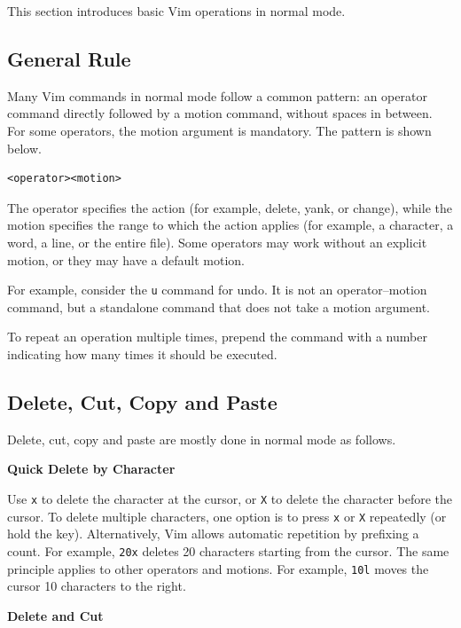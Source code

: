 This section introduces basic Vim operations in normal mode.

\subsection{General Rule}

Many Vim commands in normal mode follow a common pattern: an operator command directly followed by a motion command, without spaces in between. For some operators, the motion argument is mandatory. The pattern is shown below.
\begin{lstlisting}
<operator><motion>
\end{lstlisting}

The operator specifies the action (for example, delete, yank, or change), while the motion specifies the range to which the action applies (for example, a character, a word, a line, or the entire file). Some operators may work without an explicit motion, or they may have a default motion. 

For example, consider the \verb|u| command for undo. It is not an operator–motion command, but a standalone command that does not take a motion argument.

To repeat an operation multiple times, prepend the command with a number indicating how many times it should be executed.

\subsection{Delete, Cut, Copy and Paste}

Delete, cut, copy and paste are mostly done in normal mode as follows.

\vspace{0.1in}
\noindent \textbf{Quick Delete by Character}
\vspace{0.1in}

Use \verb|x| to delete the character at the cursor, or \verb|X| to delete the character before the cursor. To delete multiple characters, one option is to press \verb|x| or \verb|X| repeatedly (or hold the key). Alternatively, Vim allows automatic repetition by prefixing a count. For example, \verb|20x| deletes 20 characters starting from the cursor. The same principle applies to other operators and motions. For example, \verb|10l| moves the cursor 10 characters to the right.

\vspace{0.1in}
\noindent \textbf{Delete and Cut}
\vspace{0.1in}

